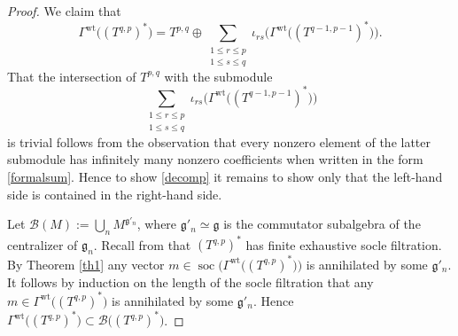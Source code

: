 \documentclass{amsart}
\renewcommand{\gg}{\mathfrak{g}}
\newcommand{\soc}{\operatorname{soc}}
\theoremstyle{definition}
\numberwithin{equation}{section}
\begin{document}
\begin{proof}
We claim that
\begin{equation} \label{decomp}
\Gamma^\mathrm{wt} \big((T^{q,p})^* \big) = T^{p,q} \oplus \sum_{\substack{1\leq r \leq p \\ 1 \leq s \leq q}} \iota_{rs} \big( \Gamma^\mathrm{wt} \big((T^{q-1,p-1})^* \big) \big).
\end{equation}
That the intersection of $T^{p,q}$ with the submodule $$\sum_{\substack{1\leq r \leq p \\ 1 \leq s \leq q}} \iota_{rs} \big( \Gamma^\mathrm{wt} \big((T^{q-1,p-1})^* \big) \big)$$ is trivial follows from the observation that every nonzero element of the latter submodule has infinitely many nonzero coefficients when written in the form \eqref{formalsum}.  Hence to show \eqref{decomp} it remains to show only that the left-hand side is contained in the right-hand side.

Let $\mathcal B (M):=\bigcup_{n}M^{\gg'_n}$, where $\gg'_n \simeq \gg$ is the commutator subalgebra of the centralizer of $\gg_n$.  Recall from \cite{PS} that 
$(T^{q,p})^*$ has finite exhaustive socle filtration. By Theorem \ref{th1} any vector $m \in \soc \big( \Gamma^\mathrm{wt}\big((T^{q,p})^* \big) \big)$ is
annihilated by some $\gg'_n$. It follows by induction on the length of
the socle filtration that any $m\in \Gamma^\mathrm{wt}\big((T^{q,p})^* \big)$
is annihilated by some $\gg'_n$. Hence $\Gamma^\mathrm{wt}\big((T^{q,p})^* \big)\subset \mathcal B\big((T^{q,p})^* \big)$.


\end{proof}
\end{document}
